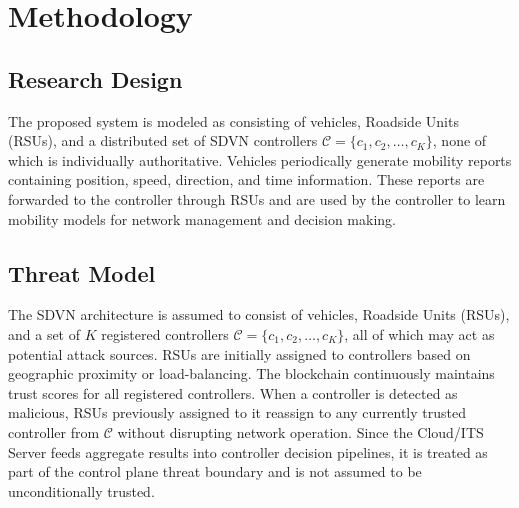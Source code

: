 %

\chapter{Methodology}

\section{Research Design}

The proposed system is modeled as consisting of vehicles, Roadside Units (RSUs), and a distributed set of SDVN controllers $\mathcal{C} = \{c_1, c_2, \ldots, c_K\}$, none of which is individually authoritative. Vehicles periodically generate mobility reports containing position, speed, direction, and time information. These reports are forwarded to the controller through RSUs and are used by the controller to learn mobility models for network management and decision making.

\section{Threat Model}
\label{sec:threat_model}

The SDVN architecture is assumed to consist of vehicles, Roadside Units (RSUs), and a set of $K$ registered controllers $\mathcal{C} = \{c_1, c_2, \ldots, c_K\}$, all of which may act as potential attack sources. RSUs are initially assigned to controllers based on geographic proximity or load-balancing. The blockchain continuously maintains trust scores for all registered controllers. When a controller is detected as malicious, RSUs previously assigned to it reassign to any currently trusted controller from $\mathcal{C}$ without disrupting network operation. Since the Cloud/ITS Server feeds aggregate results into controller decision pipelines, it is treated as part of the control plane threat boundary and is not assumed to be unconditionally trusted.


